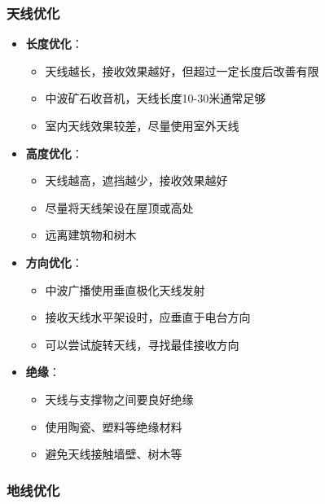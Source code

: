 \documentclass[12pt,UTF8]{ctexbook}
\begin{document}
\subsubsection{天线优化}

\begin{itemize}[leftmargin=3.5em]
    \item \textbf{长度优化}：
        \begin{itemize}[leftmargin=3.5em]
            \item 天线越长，接收效果越好，但超过一定长度后改善有限
            \item 中波矿石收音机，天线长度10-30米通常足够
            \item 室内天线效果较差，尽量使用室外天线
        \end{itemize}
    \item \textbf{高度优化}：
        \begin{itemize}[leftmargin=3.5em]
            \item 天线越高，遮挡越少，接收效果越好
            \item 尽量将天线架设在屋顶或高处
            \item 远离建筑物和树木
        \end{itemize}
    \item \textbf{方向优化}：
        \begin{itemize}[leftmargin=3.5em]
            \item 中波广播使用垂直极化天线发射
            \item 接收天线水平架设时，应垂直于电台方向
            \item 可以尝试旋转天线，寻找最佳接收方向
        \end{itemize}
    \item \textbf{绝缘}：
        \begin{itemize}[leftmargin=3.5em]
            \item 天线与支撑物之间要良好绝缘
            \item 使用陶瓷、塑料等绝缘材料
            \item 避免天线接触墙壁、树木等
        \end{itemize}
\end{itemize}

\subsubsection{地线优化}
\end{document}
